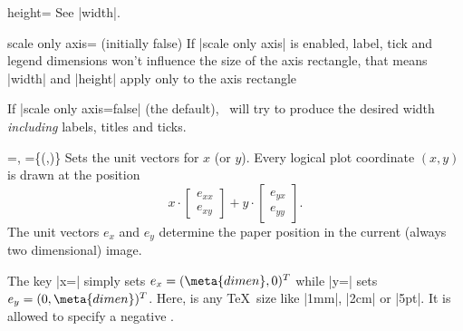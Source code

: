 \begin{pgfplotskey}{height=}
	See |width|.
\end{pgfplotskey}

\begin{pgfplotskey}{scale only axis= (initially false)}
If |scale only axis| is enabled, label, tick and legend dimensions won't influence the size of the axis rectangle, that means |width| and |height| apply only to the axis rectangle

If |scale only axis=false| (the default), \PGFPlots\ will try to produce the desired width \emph{including} labels, titles and ticks.
\end{pgfplotskey}

\begin{pgfplotsxykeylist}{
	\x=,
	\x={\{(,)\}}}
Sets the unit vectors for $x$ (or $y$). Every logical plot coordinate $(x,y)$ is drawn at the position
\[ x \cdot \begin{bmatrix} e_{xx} \\ e_{xy} \end{bmatrix} + y \cdot \begin{bmatrix} e_{yx} \\ e_{yy} \end{bmatrix}. \]
The unit vectors $e_x$ and $e_y$ determine the paper position in the current (always two dimensional) image.

The key |x=| simply sets $e_x = (\meta{dimen},0)^T $ while |y=| sets $e_y = (0,\meta{dimen})^T$.
Here,  is any \TeX\ size like |1mm|, |2cm| or |5pt|. It is allowed to specify a negative .
\begin{codeexample}[]
\end{codeexample}

\begin{codeexample}[]
\end{codeexample}


\end{pgfplotsxykeylist}
